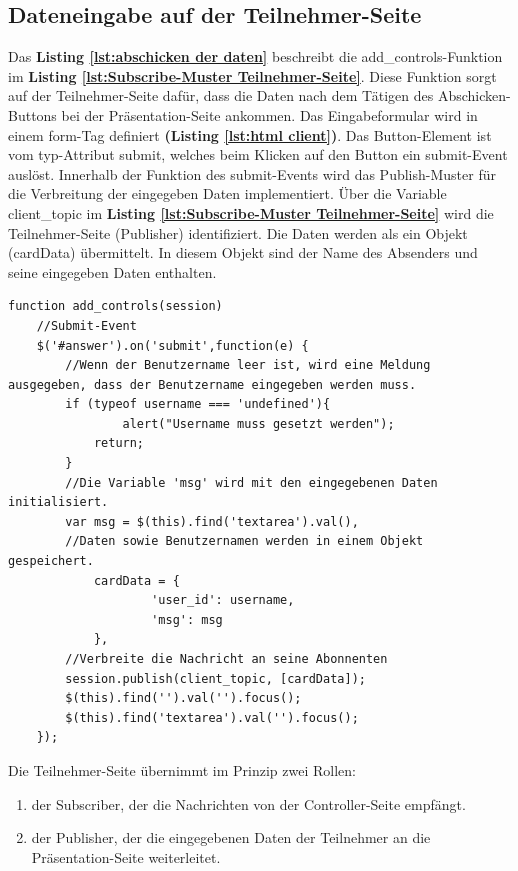 \subsection{Dateneingabe auf der Teilnehmer-Seite}
\label{subsec:Dateneingabe auf der Teilnehmer-Seite}
Das \textbf{Listing \ref{lst:abschicken der daten}} beschreibt die \glqq add\_controls\grqq{}-Funktion im \textbf{Listing \ref{lst:Subscribe-Muster Teilnehmer-Seite}}. Diese Funktion sorgt auf der Teilnehmer-Seite dafür, dass die Daten nach dem Tätigen des Abschicken-Buttons bei der Präsentation-Seite ankommen. Das Eingabeformular wird in einem form-Tag definiert \textbf{(Listing \ref{lst:html client})}. Das Button-Element ist vom typ-Attribut \glqq submit\grqq{}, welches beim Klicken auf den Button ein submit-Event auslöst. Innerhalb der Funktion des submit-Events wird das Publish-Muster für die Verbreitung der eingegeben Daten implementiert. Über die Variable \glqq client\_topic\grqq{} im \textbf{Listing \ref{lst:Subscribe-Muster Teilnehmer-Seite}} wird die Teilnehmer-Seite (Publisher) identifiziert. Die Daten werden als ein Objekt (cardData) übermittelt. In diesem Objekt sind der Name des Absenders und seine eingegeben Daten enthalten. \bigskip

\begin{lstlisting}[caption={Funktion für das Abschicken von Daten auf der Teilnehmer-Seite - JavaScript}, label=lst:abschicken der daten, captionpos=b]
function add_controls(session)
	//Submit-Event
	$('#answer').on('submit',function(e) {
		//Wenn der Benutzername leer ist, wird eine Meldung ausgegeben, dass der Benutzername eingegeben werden muss.
		if (typeof username === 'undefined'){
        		alert("Username muss gesetzt werden");
            return;
   		}
		//Die Variable 'msg' wird mit den eingegebenen Daten initialisiert.
		var msg = $(this).find('textarea').val(),
		//Daten sowie Benutzernamen werden in einem Objekt gespeichert.
			cardData = {
            		'user_id': username,
            		'msg': msg
            },
		//Verbreite die Nachricht an seine Abonnenten
		session.publish(client_topic, [cardData]);
		$(this).find('').val('').focus();
		$(this).find('textarea').val('').focus();
	});
\end{lstlisting}

Die Teilnehmer-Seite übernimmt im Prinzip zwei Rollen:
\begin{enumerate}
\item der Subscriber, der die Nachrichten von der Controller-Seite empfängt.
\item der Publisher, der die eingegebenen Daten der Teilnehmer an die Präsentation-Seite weiterleitet.
\end{enumerate}

